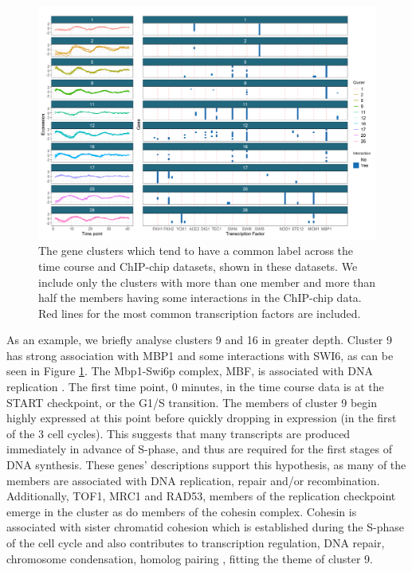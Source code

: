 \documentclass{bioinfo}
\begin{document}
\begin{figure}
	\centering
	\includegraphics[scale=0.45]{./SupplementaryMaterial/Images/Yeast/timecourseChIPchipFused.png}
	\caption{The gene clusters which tend to have a common label across the time course and ChIP-chip datasets, shown in these datasets. We include only the clusters with more than one member and more than half the members having some interactions in the ChIP-chip data. Red lines for the most common transcription factors are included.}
	\label{fig:timepointChIPchipFused}
\end{figure}

As an example, we briefly analyse clusters 9 and 16 in greater depth. Cluster 9 has strong association with MBP1 and some interactions with SWI6, as can be seen in Figure \ref{fig:timepointChIPchipFused}. The Mbp1-Swi6p complex, MBF, is associated with DNA replication \citep{iyer2001genomic}. The first time point, 0 minutes, in the time course data is at the START checkpoint, or the G1/S transition. The members of cluster 9 begin highly expressed at this point before quickly dropping in expression (in the first of the 3 cell cycles). This suggests that many transcripts are produced immediately in advance of S-phase, and thus are required for the first stages of DNA synthesis. 
These genes' descriptions \citep[found using \texttt{org.Sc.sgd.db},][and shown in Table 3 of the Supplementary Material]{carlson2014org} support this hypothesis, as many of the members are associated with DNA replication, repair and/or recombination. Additionally, TOF1, MRC1 and RAD53, members of the replication checkpoint \citep{bando2009csm3, lao2018yeast} emerge in the cluster as do members of the cohesin complex. Cohesin is associated with sister chromatid cohesion which is established during the S-phase of the cell cycle \citep{toth1999yeast} and also contributes to transcription regulation, DNA repair, chromosome condensation, homolog pairing \citep{mehta2013cohesin}, fitting the theme of cluster 9.
\end{document}
